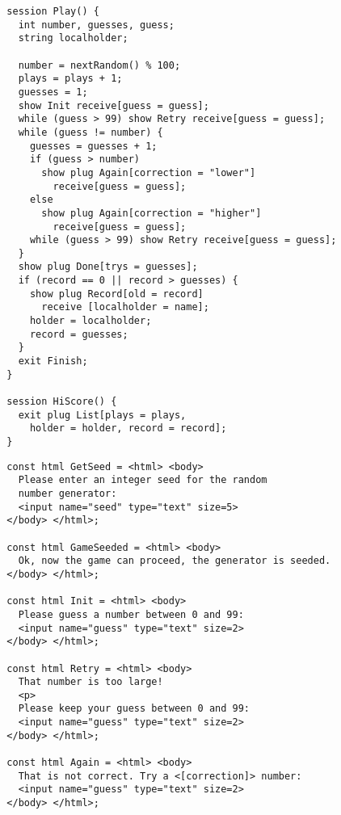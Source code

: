 \begin{slide*}
\begin{scriptsize}
\begin{verbatim}
  session Play() {
    int number, guesses, guess;
    string localholder;
    
    number = nextRandom() % 100;
    plays = plays + 1;
    guesses = 1;
    show Init receive[guess = guess];
    while (guess > 99) show Retry receive[guess = guess];
    while (guess != number) {
      guesses = guesses + 1;
      if (guess > number) 
        show plug Again[correction = "lower"] 
          receive[guess = guess];
      else
        show plug Again[correction = "higher"] 
          receive[guess = guess];
      while (guess > 99) show Retry receive[guess = guess];
    }  
    show plug Done[trys = guesses];
    if (record == 0 || record > guesses) {
      show plug Record[old = record] 
        receive [localholder = name];
      holder = localholder;
      record = guesses;
    }  
    exit Finish;
  } 
  
  session HiScore() {
    exit plug List[plays = plays,
      holder = holder, record = record];
  } 
\end{verbatim}
\end{scriptsize}
\vfil
\end{slide*}

\begin{slide*}
\begin{scriptsize}
\begin{verbatim}
  const html GetSeed = <html> <body>
    Please enter an integer seed for the random 
    number generator:
    <input name="seed" type="text" size=5>
  </body> </html>;
  
  const html GameSeeded = <html> <body>
    Ok, now the game can proceed, the generator is seeded.
  </body> </html>;
    
  const html Init = <html> <body>
    Please guess a number between 0 and 99:
    <input name="guess" type="text" size=2>
  </body> </html>;
    
  const html Retry = <html> <body>
    That number is too large!
    <p> 
    Please keep your guess between 0 and 99:
    <input name="guess" type="text" size=2>
  </body> </html>;
  
  const html Again = <html> <body>
    That is not correct. Try a <[correction]> number:
    <input name="guess" type="text" size=2>
  </body> </html>;
\end{verbatim}
\end{scriptsize}
\vfil
\end{slide*}
 

